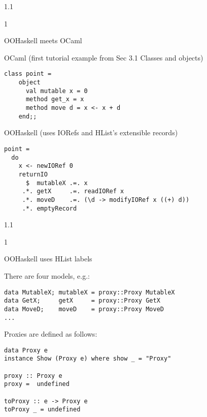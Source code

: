 \documentclass{slides}
\newenvironment{myslide}{\begin{slide}\color{Blue}\begin{boxedminipage}{1.1\hsize}\begin{boxedminipage}{1\hsize}\color{Black}
\vspace{-170\in}
}{%
\smallskip
\end{boxedminipage}
\end{boxedminipage}
\end{slide}}
\newenvironment{myslide}{\begin{slide}
}{%
\end{slide}}
\newenvironment{myslide}{\begin{slide}\color{White}\begin{boxedminipage}{1.1\hsize}\color{Black}
\vspace{-170\in}
}{%
\smallskip
\end{boxedminipage}
\end{slide}}
\newcommand{\header}[1]{{\large \color{Red} #1}}
\begin{document}
\begin{myslide}

\header{OOHaskell meets OCaml}

{\tiny

OCaml (first tutorial example from Sec 3.1 Classes and objects)

\begin{verbatim}
class point =
    object
      val mutable x = 0
      method get_x = x
      method move d = x <- x + d
    end;;
\end{verbatim}

OOHaskell (uses IORefs and HList's extensible records)

\begin{verbatim}
point =
  do
    x <- newIORef 0
    returnIO
      $  mutableX .=. x
     .*. getX     .=. readIORef x
     .*. moveD    .=. (\d -> modifyIORef x ((+) d))
     .*. emptyRecord
\end{verbatim}

}

\end{myslide}






\begin{myslide}

\header{OOHaskell uses HList labels}

{\small

There are four models, e.g.:

\begin{verbatim}
data MutableX; mutableX = proxy::Proxy MutableX
data GetX;     getX     = proxy::Proxy GetX
data MoveD;    moveD    = proxy::Proxy MoveD
...
\end{verbatim}

Proxies are defined as follows:

\begin{verbatim}
data Proxy e
instance Show (Proxy e) where show _ = "Proxy"

proxy :: Proxy e
proxy =  undefined

toProxy :: e -> Proxy e
toProxy _ = undefined
\end{verbatim}

}

\end{myslide}



\end{document}
